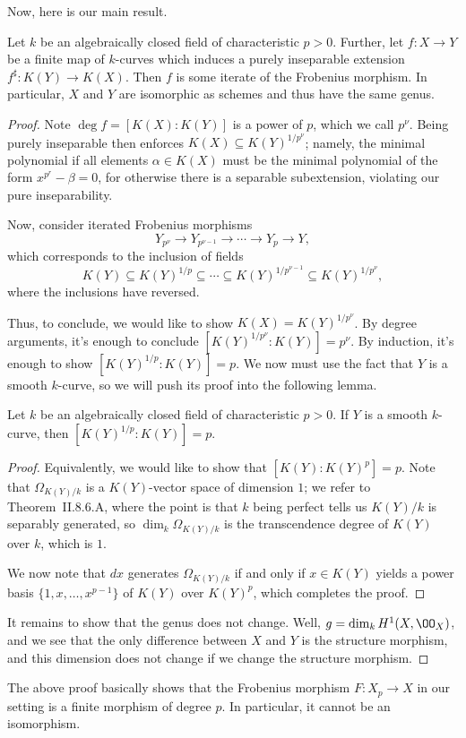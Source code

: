 \documentclass[../notes.tex]{subfiles}
\begin{document}
Now, here is our main result.
\begin{theorem} \label{thm:all-is-frob}
	Let $k$ be an algebraically closed field of characteristic $p>0$. Further, let $f\colon X\to Y$ be a finite map of $k$-curves which induces a purely inseparable extension $f^\sharp\colon K(Y)\to K(X)$. Then $f$ is some iterate of the Frobenius morphism. In particular, $X$ and $Y$ are isomorphic as schemes and thus have the same genus.
\end{theorem}
\begin{proof}
	Note $\deg f=[K(X):K(Y)]$ is a power of $p$, which we call $p^\nu$. Being purely inseparable then enforces $K(X)\subseteq K(Y)^{1/p^\nu}$; namely, the minimal polynomial if all elements $\alpha\in K(X)$ must be the minimal polynomial of the form $x^{p^r}-\beta=0$, for otherwise there is a separable subextension, violating our pure inseparability.

	Now, consider iterated Frobenius morphisms
	\[Y_{p^\nu}\to Y_{p^{\nu-1}}\to\cdots\to Y_p\to Y,\]
	which corresponds to the inclusion of fields
	\[K(Y)\subseteq K(Y)^{1/p}\subseteq\cdots\subseteq K(Y)^{1/p^{\nu-1}}\subseteq K(Y)^{1/p^\nu},\]
	where the inclusions have reversed.
	
	Thus, to conclude, we would like to show $K(X)=K(Y)^{1/p^\nu}$. By degree arguments, it's enough to conclude $\left[K(Y)^{1/p^\nu}:K(Y)\right]=p^\nu$. By induction, it's enough to show $\left[K(Y)^{1/p}:K(Y)\right]=p$. We now must use the fact that $Y$ is a smooth $k$-curve, so we will push its proof into the following lemma.
	\begin{lemma}
		Let $k$ be an algebraically closed field of characteristic $p>0$. If $Y$ is a smooth $k$-curve, then $\left[K(Y)^{1/p}:K(Y)\right]=p$.
	\end{lemma}
	\begin{proof}
		Equivalently, we would like to show that $\left[K(Y):K(Y)^p\right]=p$. Note that $\Omega_{K(Y)/k}$ is a $K(Y)$-vector space of dimension $1$; we refer to Theorem~II.8.6.A, where the point is that $k$ being perfect tells us $K(Y)/k$ is separably generated, so $\dim_k\Omega_{K(Y)/k}$ is the transcendence degree of $K(Y)$ over $k$, which is $1$.

		We now note that $dx$ generates $\Omega_{K(Y)/k}$ if and only if $x\in K(Y)$ yields a power basis $\{1,x,\ldots,x^{p-1}\}$ of $K(Y)$ over $K(Y)^p$, which completes the proof.
	\end{proof}
	It remains to show that the genus does not change. Well, $g=\dim_kH^1(X,\OO_X)$, and we see that the only difference between $X$ and $Y$ is the structure morphism, and this dimension does not change if we change the structure morphism.
\end{proof}
\begin{remark}
	The above proof basically shows that the Frobenius morphism $F\colon X_p\to X$ in our setting is a finite morphism of degree $p$. In particular, it cannot be an isomorphism.
\end{remark}
\end{document}
